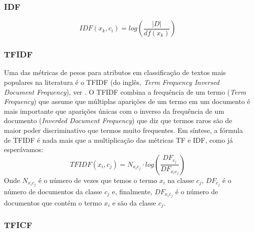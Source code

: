 \subsubsection{IDF}
\label{subsubsection::idf}

\cite{ChihHow04}
\begin{equation}\label{eqn::tficf}
   IDF(x_k, c_i) = log( \frac{|D|} {df(x_k)} )
\end{equation}

\subsubsection{TFIDF}
\label{subsubsection::tfidf}

Uma das métricas de pesos para atributos em classificação de textos mais populares na literatura é o TFIDF (do inglês, \textit{Term Frequency Inversed Document Frequency}), ver \cite{Salton88}. O TFIDF combina a frequência de um termo (\textit{Term Frequency}) que assume que múltiplas aparições de um termo em um documento é mais importante que aparições únicas com o inverso da frequência de um documento (\textit{Inverded Document Frequency}) que diz que termos raros são de maior poder discriminativo que termos muito frequentes. Em síntese, a fórmula de TFIDF é nada mais que a multiplicação das métricas TF e IDF, como já esperávamos:
\begin{equation}\label{eqn::tficf}
   TFIDF(x_i, c_j) =  N_{x_ic_j} \cdot log( \frac{DF_{c_j}}{ DF_{x_ic_j} } )
\end{equation}
Onde $N_{x_ic_j}$ é o número de vezes que temos o termo $x_i$ na classe $c_j$, $DF_{c_j}$ é o número de documentos da classe $c_j$ e, finalmente, $DF_{x_ic_j}$ é o número de documentos que contém o termo $x_i$ e são da classe $c_j$.

\subsubsection{TFICF}
\label{subsubsection::tficf}

